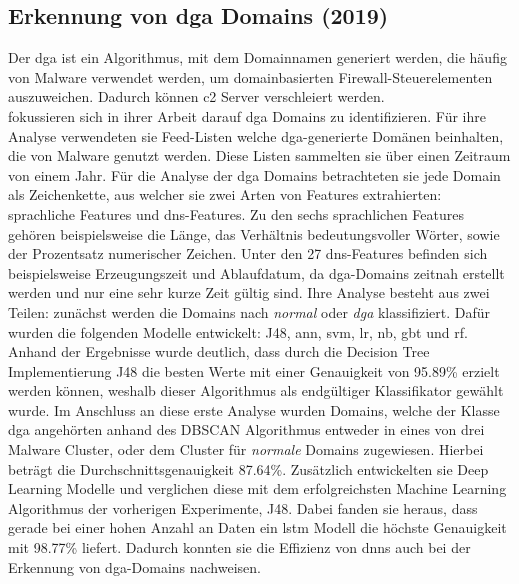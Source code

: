 \documentclass[
    12pt, %
    DIV10,
    ngerman, %
    a4paper, %
    oneside, %
    titlepage, %
    parskip=half, %
    headings=normal, %
    listof=totoc, %
    bibliography=totoc, %
    index=totoc, %
    captions=tableheading, %
    final %
]{scrreprt}
\begin{document}
\subsection{Erkennung von \acs{dga} Domains (2019)}
Der \ac{dga} ist ein Algorithmus, mit dem Domainnamen generiert werden, die häufig von Malware verwendet werden, um domainbasierten Firewall-Steuerelementen auszuweichen. Dadurch können \ac{c2} Server verschleiert werden.\\
\textcite{Li2019} fokussieren sich in ihrer Arbeit darauf \ac{dga} Domains zu identifizieren. Für ihre Analyse verwendeten sie Feed-Listen \parencite{Bam} welche \ac{dga}-generierte Domänen beinhalten, die von Malware genutzt werden. Diese Listen sammelten sie über einen Zeitraum von einem Jahr. Für die Analyse der \ac{dga} Domains betrachteten sie jede Domain als Zeichenkette, aus welcher sie zwei Arten von Features extrahierten: sprachliche Features und \ac{dns}-Features. Zu den sechs sprachlichen Features gehören beispielsweise die Länge, das Verhältnis bedeutungsvoller Wörter, sowie der Prozentsatz numerischer Zeichen. Unter den 27 \ac{dns}-Features befinden sich beispielsweise Erzeugungszeit und Ablaufdatum, da \ac{dga}-Domains zeitnah erstellt werden und nur eine sehr kurze Zeit gültig sind. Ihre Analyse besteht aus zwei Teilen: zunächst werden die Domains nach \emph{normal} oder \emph{\ac{dga}} klassifiziert. Dafür wurden die folgenden Modelle entwickelt: J48, \ac{ann}, \ac{svm}, \ac{lr}, \ac{nb}, \ac{gbt} und \ac{rf}. Anhand der Ergebnisse wurde deutlich, dass durch die Decision Tree Implementierung J48 die besten Werte mit einer Genauigkeit von 95.89\% erzielt werden können, weshalb dieser Algorithmus als endgültiger Klassifikator gewählt wurde.
Im Anschluss an diese erste Analyse wurden Domains, welche der Klasse \ac{dga} angehörten anhand des DBSCAN Algorithmus entweder in eines von drei Malware Cluster, oder dem Cluster für \emph{normale} Domains zugewiesen. Hierbei beträgt die Durchschnittsgenauigkeit 87.64\%. Zusätzlich entwickelten sie Deep Learning Modelle und verglichen diese mit dem erfolgreichsten Machine Learning Algorithmus der vorherigen Experimente, J48. Dabei fanden sie heraus, dass gerade bei einer hohen Anzahl an Daten ein \ac{lstm} Modell die höchste Genauigkeit mit 98.77\% liefert. Dadurch konnten sie die Effizienz von \ac{dnns} auch bei der Erkennung von \ac{dga}-Domains nachweisen.
%
\end{document}
